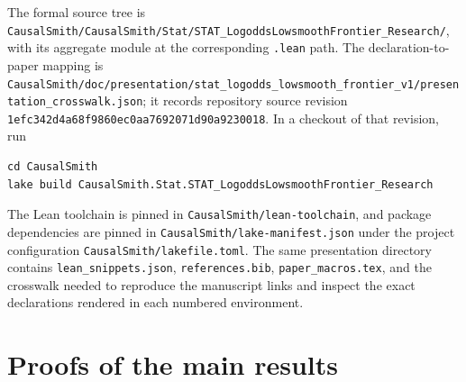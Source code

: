 \documentclass[11pt]{article}
\begin{document}
The formal source tree is
\texttt{CausalSmith/CausalSmith/Stat/STAT\_LogoddsLowsmoothFrontier\_Research/},
with its aggregate module at the corresponding \texttt{.lean} path. The
declaration-to-paper mapping is
\texttt{CausalSmith/doc/presentation/stat\_logodds\_lowsmooth\_frontier\_v1/presentation\_crosswalk.json};
it records repository source revision
\texttt{1efc342d4a68f9860ec0aa7692071d90a9230018}. In a checkout of that revision,
run
\begin{verbatim}
cd CausalSmith
lake build CausalSmith.Stat.STAT_LogoddsLowsmoothFrontier_Research
\end{verbatim}
The Lean toolchain is pinned in \texttt{CausalSmith/lean-toolchain}, and package
dependencies are pinned in \texttt{CausalSmith/lake-manifest.json} under the
project configuration \texttt{CausalSmith/lakefile.toml}. The same presentation
directory contains \texttt{lean\_snippets.json}, \texttt{references.bib},
\texttt{paper\_macros.tex}, and the crosswalk needed to reproduce the manuscript
links and inspect the exact declarations rendered in each numbered environment.


\section{Proofs of the main results}\label{sec:deferred-proofs}
\end{document}
